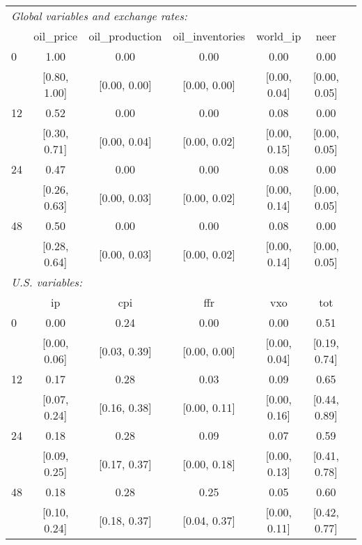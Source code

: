 \begin{tabular}{lcccccc}\toprule\midrule  
\multicolumn{6}{l}{\textit{Global variables and exchange rates:}} \\ 
 & oil_price & oil_production & oil_inventories & world_ip & neer  \\ \midrule  
 0 &     1.00 &     0.00 &     0.00 &     0.00 &     0.00  \\  
 & [0.80,    1.00] & [0.00,    0.00] & [0.00,    0.00] & [0.00,    0.04] & [0.00,    0.05] \\  
 12 &     0.52 &     0.00 &     0.00 &     0.08 &     0.00  \\  
 & [0.30,    0.71] & [0.00,    0.04] & [0.00,    0.02] & [0.00,    0.15] & [0.00,    0.05] \\  
 24 &     0.47 &     0.00 &     0.00 &     0.08 &     0.00  \\  
 & [0.26,    0.63] & [0.00,    0.03] & [0.00,    0.02] & [0.00,    0.14] & [0.00,    0.05] \\  
 48 &     0.50 &     0.00 &     0.00 &     0.08 &     0.00  \\  
 & [0.28,    0.64] & [0.00,    0.03] & [0.00,    0.02] & [0.00,    0.14] & [0.00,    0.05] \\[2ex] \midrule  
\multicolumn{6}{l}{\textit{U.S. variables:}} \\ 
 & ip & cpi & ffr & vxo & tot  \\ \midrule  
 0 &     0.00 &     0.24 &     0.00 &     0.00 &     0.51  \\  
 & [0.00,    0.06] & [0.03,    0.39] & [0.00,    0.00] & [0.00,    0.04] & [0.19,    0.74] \\  
 12 &     0.17 &     0.28 &     0.03 &     0.09 &     0.65  \\  
 & [0.07,    0.24] & [0.16,    0.38] & [0.00,    0.11] & [0.00,    0.16] & [0.44,    0.89] \\  
 24 &     0.18 &     0.28 &     0.09 &     0.07 &     0.59  \\  
 & [0.09,    0.25] & [0.17,    0.37] & [0.00,    0.18] & [0.00,    0.13] & [0.41,    0.78] \\  
 48 &     0.18 &     0.28 &     0.25 &     0.05 &     0.60  \\  
 & [0.10,    0.24] & [0.18,    0.37] & [0.04,    0.37] & [0.00,    0.11] & [0.42,    0.77] \\  
\midrule\bottomrule 
\end{tabular}
